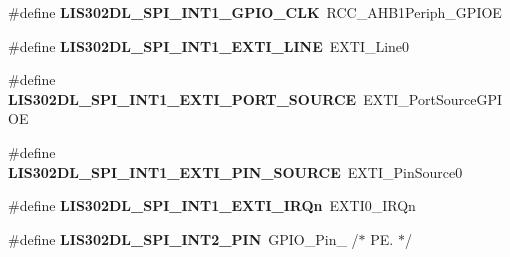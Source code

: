 \begin{DoxyCompactItemize}
\item 
\hypertarget{group___s_t_m32_f4___d_i_s_c_o_v_e_r_y___l_i_s302_d_l___exported___constants_ga2ff8c81e12d8bb697e581a8fa2d94480}{\#define {\bfseries L\-I\-S302\-D\-L\-\_\-\-S\-P\-I\-\_\-\-I\-N\-T1\-\_\-\-G\-P\-I\-O\-\_\-\-C\-L\-K}~R\-C\-C\-\_\-\-A\-H\-B1\-Periph\-\_\-\-G\-P\-I\-O\-E}\label{group___s_t_m32_f4___d_i_s_c_o_v_e_r_y___l_i_s302_d_l___exported___constants_ga2ff8c81e12d8bb697e581a8fa2d94480}

\item 
\hypertarget{group___s_t_m32_f4___d_i_s_c_o_v_e_r_y___l_i_s302_d_l___exported___constants_ga32da18369bb1f1a51f5318ac928ee357}{\#define {\bfseries L\-I\-S302\-D\-L\-\_\-\-S\-P\-I\-\_\-\-I\-N\-T1\-\_\-\-E\-X\-T\-I\-\_\-\-L\-I\-N\-E}~E\-X\-T\-I\-\_\-\-Line0}\label{group___s_t_m32_f4___d_i_s_c_o_v_e_r_y___l_i_s302_d_l___exported___constants_ga32da18369bb1f1a51f5318ac928ee357}

\item 
\hypertarget{group___s_t_m32_f4___d_i_s_c_o_v_e_r_y___l_i_s302_d_l___exported___constants_gadbcd56817a00f20773ef4510323bfd8a}{\#define {\bfseries L\-I\-S302\-D\-L\-\_\-\-S\-P\-I\-\_\-\-I\-N\-T1\-\_\-\-E\-X\-T\-I\-\_\-\-P\-O\-R\-T\-\_\-\-S\-O\-U\-R\-C\-E}~E\-X\-T\-I\-\_\-\-Port\-Source\-G\-P\-I\-O\-E}\label{group___s_t_m32_f4___d_i_s_c_o_v_e_r_y___l_i_s302_d_l___exported___constants_gadbcd56817a00f20773ef4510323bfd8a}

\item 
\hypertarget{group___s_t_m32_f4___d_i_s_c_o_v_e_r_y___l_i_s302_d_l___exported___constants_ga0c430ac3f051208b25243e3a30f2f38f}{\#define {\bfseries L\-I\-S302\-D\-L\-\_\-\-S\-P\-I\-\_\-\-I\-N\-T1\-\_\-\-E\-X\-T\-I\-\_\-\-P\-I\-N\-\_\-\-S\-O\-U\-R\-C\-E}~E\-X\-T\-I\-\_\-\-Pin\-Source0}\label{group___s_t_m32_f4___d_i_s_c_o_v_e_r_y___l_i_s302_d_l___exported___constants_ga0c430ac3f051208b25243e3a30f2f38f}

\item 
\hypertarget{group___s_t_m32_f4___d_i_s_c_o_v_e_r_y___l_i_s302_d_l___exported___constants_gad2f8edd9efd34c3134b4bafa467fa4c6}{\#define {\bfseries L\-I\-S302\-D\-L\-\_\-\-S\-P\-I\-\_\-\-I\-N\-T1\-\_\-\-E\-X\-T\-I\-\_\-\-I\-R\-Qn}~E\-X\-T\-I0\-\_\-\-I\-R\-Qn}\label{group___s_t_m32_f4___d_i_s_c_o_v_e_r_y___l_i_s302_d_l___exported___constants_gad2f8edd9efd34c3134b4bafa467fa4c6}

\item 
\hypertarget{group___s_t_m32_f4___d_i_s_c_o_v_e_r_y___l_i_s302_d_l___exported___constants_gabb5784c5da1e4293fe5f50cd0e2ef3dd}{\#define {\bfseries L\-I\-S302\-D\-L\-\_\-\-S\-P\-I\-\_\-\-I\-N\-T2\-\_\-\-P\-I\-N}~G\-P\-I\-O\-\_\-\-Pin\-\_                  /$\ast$ P\-E. $\ast$/}\label{group___s_t_m32_f4___d_i_s_c_o_v_e_r_y___l_i_s302_d_l___exported___constants_gabb5784c5da1e4293fe5f50cd0e2ef3dd}


\end{DoxyCompactItemize}
